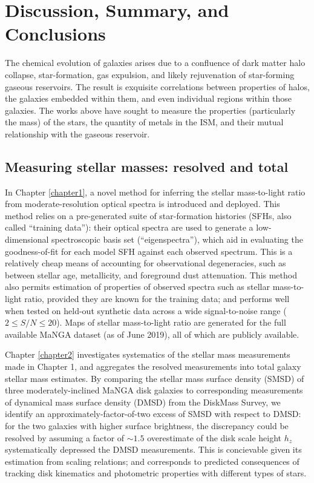 \chapter{Discussion, Summary, and Conclusions}

The chemical evolution of galaxies arises due to a confluence of dark matter halo collapse, star-formation, gas expulsion, and likely rejuvenation of star-forming gaseous reservoirs. The result is exquisite correlations between properties of halos, the galaxies embedded within them, and even individual regions within those galaxies. The works above have sought to measure the properties (particularly the mass) of the stars, the quantity of metals in the ISM, and their mutual relationship with the gaseous reservoir.

\section{Measuring stellar masses: resolved and total}

In Chapter \ref{chapter1}, a novel method for inferring the stellar mass-to-light ratio from moderate-resolution optical spectra is introduced and deployed. This method relies on a pre-generated suite of star-formation histories (SFHs, also called ``training data''): their optical spectra are used to generate a low-dimensional spectroscopic basis set (``eigenspectra''), which aid in evaluating the goodness-of-fit for each model SFH against each observed spectrum. This is a relatively cheap means of accounting for observational degeneracies, such as between stellar age, metallicity, and foreground dust attenuation. This method also permits estimation of properties of observed spectra such as stellar mass-to-light ratio, provided they are known for the training data; and performs well when tested on held-out synthetic data across a wide signal-to-noise range ($2 \le S/N \le 20$). Maps of stellar mass-to-light ratio are generated for the full available MaNGA dataset (as of June 2019), all of which are publicly available.

Chapter \ref{chapter2} investigates systematics of the stellar mass measurements made in Chapter 1, and aggregates the resolved measurements into total galaxy stellar mass estimates. By comparing the stellar mass surface density (SMSD) of three moderately-inclined MaNGA disk galaxies to corresponding measurements of dynamical mass surface density (DMSD) from the DiskMass Survey, we identify an approximately-factor-of-two excess of SMSD with respect to DMSD: for the two galaxies with higher surface brightness, the discrepancy could be resolved by assuming a factor of $\sim 1.5$ overestimate of the disk scale height $h_z$ systematically depressed the DMSD measurements. This is concievable given its estimation from scaling relations; and corresponds to predicted consequences of tracking disk kinematics and photometric properties with different types of stars. 

